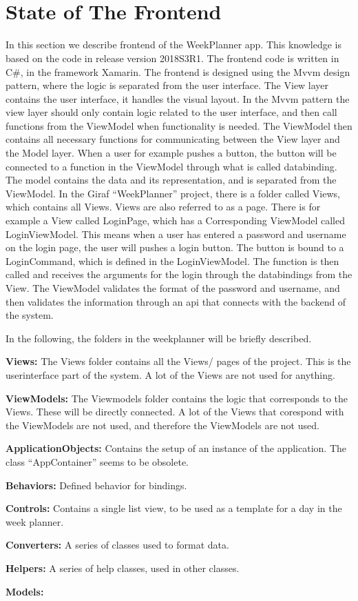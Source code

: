 \section{\\State of The Frontend} \label{sec:StateFrontend}

In this section we describe frontend of the WeekPlanner app. This knowledge is based on the code in release version 2018S3R1. 
The frontend code is written in C\#, in the framework Xamarin. The frontend is designed using the \gls{Mvvm} design pattern, where the logic is separated from the user interface. The View layer contains the user interface, it handles the visual layout. In the \gls{Mvvm} pattern the view layer should only contain logic related to the user interface, and then call functions from the ViewModel when functionality is needed. The ViewModel then contains all necessary functions for communicating between the View layer and the Model layer. When a user for example pushes a button, the button will be connected to a function in the ViewModel through what is called databinding. 
The model contains the data and its representation, and is separated from the ViewModel. 
In the Giraf “WeekPlanner” project, there is a folder called Views, which contains all Views. Views are also referred to as a page. There is for example a View called LoginPage, which has a Corresponding ViewModel called LoginViewModel. This means when a user has entered a password and username on the login page, the user will pushes a login button. The button is bound to a LoginCommand, which is defined in the LoginViewModel. The function is then called and receives the arguments for the login through the databindings from the View. The ViewModel validates the format of the password and username, and then validates the information through an api that connects with the backend of the system. 

In the following, the folders in the weekplanner will be briefly described.

\textbf{Views:}
The Views folder contains all the Views/ pages of the project. This is the userinterface part of the system. A lot of the Views are not used for anything. 

\textbf{ViewModels:}
The Viewmodels folder contains the logic that corresponds to the Views. These will be directly connected. A lot of the Views that corespond with the ViewModels are not used, and therefore the ViewModels are not used.

\textbf{ApplicationObjects:}
Contains the setup of an instance of the application. The class “AppContainer” seems to be obsolete. 

\textbf{Behaviors: }
Defined behavior for bindings. 

\textbf{Controls:}
Contains a single list view, to be used as a template for a day in the week planner. 

\textbf{Converters:} 
A series of classes used to format data. 

\textbf{Helpers: }
A series of help classes, used in other classes. 

\textbf{Models:}
